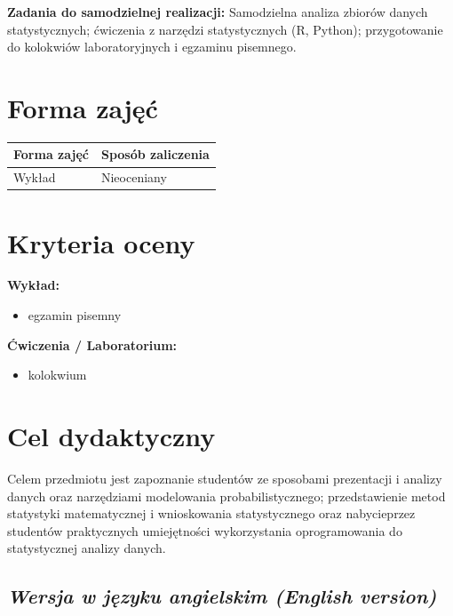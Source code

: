\documentclass[12pt, a4paper]{article}
\newcommand{\thdrule}{\noalign{\global\setlength{\extrarowheight}{0pt}}}
\newcommand{\thdend}{\noalign{\global\setlength{\extrarowheight}{3pt}}}
\begin{document}
\vspace{4pt}
\noindent\textbf{Zadania do samodzielnej realizacji:} Samodzielna analiza zbiorów danych statystycznych; ćwiczenia z narzędzi statystycznych (R, Python); przygotowanie do kolokwiów laboratoryjnych i egzaminu pisemnego.

\section{Forma zajęć}

\begin{center}
{\scriptsize
\begin{tabular}{m{5cm}m{8cm}}
\thdrule\toprule
\rowcolor{pjatkRed} {\color{white}\textbf{Forma zajęć}} & {\color{white}\textbf{Sposób zaliczenia}} \\
\midrule\thdend
  \rowcolor{tableRowLight} Wykład & Nieoceniany \\
\bottomrule
\end{tabular}}
\end{center}

\section{Kryteria oceny}

\textbf{Wykład:}
\begin{itemize}
  \item egzamin pisemny
\end{itemize}
\vspace{4pt}
\textbf{Ćwiczenia / Laboratorium:}
\begin{itemize}
  \item kolokwium
\end{itemize}


\section{Cel dydaktyczny}

Celem przedmiotu jest zapoznanie studentów ze sposobami prezentacji i analizy danych oraz narzędziami modelowania probabilistycznego; przedstawienie metod statystyki matematycznej i wnioskowania statystycznego oraz nabycieprzez studentów praktycznych umiejętności wykorzystania oprogramowania do statystycznej analizy danych.

\subsection*{\textit{Wersja w języku angielskim (English version)}}
\end{document}
